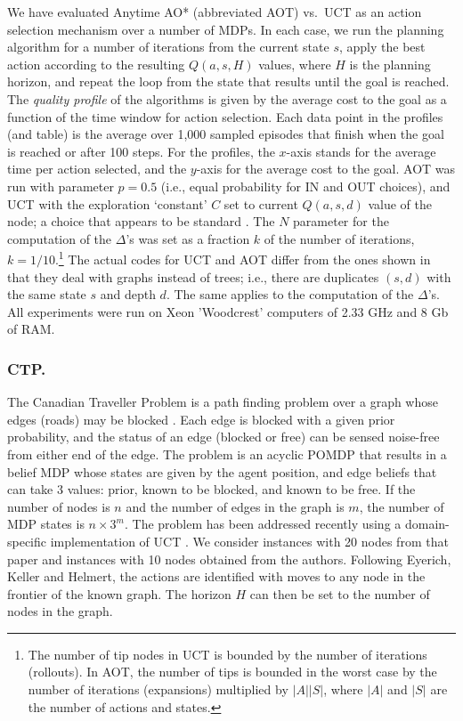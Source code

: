 \documentclass[letterpaper]{article}
\begin{document}
We have evaluated Anytime AO* (abbreviated AOT)  vs.\ UCT as an action selection mechanism
over a number of MDPs. In each case, we run the planning algorithm
for a number of iterations from the current state $s$, 
apply the best action according to the resulting $Q(a,s,H)$ values,  where $H$ is the planning
horizon, and repeat the loop from the  state that results until the goal is reached. 
The \emph{quality profile} of the algorithms is given by the average cost to the 
goal  as a function of the time window for action selection. 
Each data point in the profiles (and table) is the average over 1,000 sampled episodes
that finish when the goal is reached or after  100 steps. For the profiles, the $x$-axis 
stands for the average time per action selected, and the $y$-axis  for the average cost to the goal.
AOT was run with parameter  $p=0.5$ (i.e., equal probability for IN and OUT choices),
and UCT with the exploration `constant' $C$ set to current $Q(a,s,d)$ value of the node;
a choice that appears to be   standard \cite{fern:uct,malte:ctp}. 
The $N$ parameter for the computation of the $\Delta$'s was 
set as a fraction $k$ of the number of iterations, $k=1/10$.\footnote{The number of tip nodes 
in UCT is bounded by the number of iterations (rollouts). In AOT, the number 
of tips is bounded in the worst case by the number of iterations (expansions) multiplied by 
$|A||S|$,  where $|A|$ and $|S|$ are the number of actions and states.}  
The actual codes for UCT and AOT differ from the ones shown
in that they deal with graphs instead of trees; i.e., there are duplicates
$(s,d)$ with the same state $s$ and depth $d$. The same applies to the computation
of the $\Delta$'s.
All experiments were run on Xeon 'Woodcrest' computers of 2.33 GHz and 8 Gb of RAM. 

\subsubsection{CTP.} The  Canadian Traveller Problem  is  a path
finding problem over a graph whose edges (roads) may be blocked
 \cite{ctp:intro}. Each edge is blocked with a given prior probability,
and the status of an edge (blocked or free) can be sensed noise-free 
from either end of the edge. The problem is an acyclic POMDP that
results in a belief MDP whose states are given by the agent position, 
and edge  beliefs that can take 3 values: prior, known to be blocked, and
known to be free.  If the number of nodes is $n$ and the number of edges
in the graph is $m$, the number of MDP states is  $n \times 3^m$.
The problem has been addressed recently using a 
domain-specific implementation of UCT \cite{malte:ctp}. 
We consider instances with 20 nodes from that paper
and instances  with 10 nodes obtained from the authors.
Following  Eyerich,  Keller and Helmert, the actions are  identified with moves
to any node in the  frontier of the known graph. The horizon $H$ can then 
be set to the number of nodes in the graph.
\end{document}
